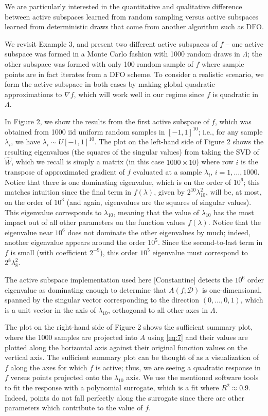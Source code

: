 \documentclass{amsart}
\begin{document}
We are particularly interested in the quantitative and qualitative difference between active subspaces learned from random sampling versus active subspaces learned from deterministic draws that come from another algorithm such as DFO.


We revisit Example 3, and present two different active subspaces of $f$ -- one active subspace was formed in a Monte Carlo fashion with 1000 random draws in $\Lambda$; the other subspace was formed with only 100 random sample of $f$ where sample points are in fact iterates from a DFO scheme. To consider a realistic scenario, we form the active subspace in both cases by making global quadratic approximations to $\nabla f$, which will work well in our regime since $f$ is quadratic in $\Lambda$.

In Figure 2, we show the results from the first active subspace of $f$, which was obtained from 1000 iid uniform random samples in $[-1,1]^{10}$; i.e., for any sample $\lambda_i$, we have $\lambda_i \sim U[-1,1]^{10}$. The plot on the left-hand side of Figure 2 shows the resulting eigenvalues (the squares of the singular values) from taking the SVD of $\hat{W}$, which we recall is simply a matrix (in this case $1000 \times 10$) where row $i$ is the transpose of approximated gradient of $f$ evaluated at a sample $\lambda_i$, $i=1,\ldots,1000$. Notice that there is one dominating eigenvalue, which is on the order of $10^6$; this matches intuition since the final term in $f(\lambda)$, given by $2^{10}\lambda_{10}^2$, will be, at most, on the order of $10^3$ (and again, eigenvalues are the squares of singular values). This eigenvalue corresponds to $\lambda_{10}$, meaning that the value of $\lambda_{10}$ has the most impact out of all other parameters on the function values $f(\lambda)$. Notice that the eigenvalue near $10^6$ does not dominate the other eigenvalues by much; indeed, another eigenvalue appears around the order $10^5$. Since the second-to-last term in $f$ is small (with coefficient $2^{-9}$), this order $10^5$ eigenvalue must correspond to $2^8\lambda_8^2$.

The active subspace implementation used here [Constantine] detects the $10^6$ order eigenvalue as dominating enough to determine that $A(f;\mathcal{D})$ is one-dimensional, spanned by the singular vector corresponding to the direction $(0,\ldots,0,1)$, which is a unit vector in the axis of $\lambda_{10}$, orthogonal to all other axes in $\Lambda$.

The plot on the right-hand side of Figure 2 shows the sufficient summary plot, where the 1000 samples are projected into $A$ using \eqref{eq:7} and their values are plotted along the horizontal axis against their original function values on the vertical axis. The sufficient summary plot can be thought of as a visualization of $f$ along the axes for which $f$ is active; thus, we are seeing a quadratic response in $f$ versus points projected onto the $\lambda_{10}$ axis. We use the mentioned software tools to fit the response with a polynomial surrogate, which is a fit where $R^2\approx 0.9$. Indeed, points do not fall perfectly along the surrogate since there are other parameters which contribute to the value of $f$.
\end{document}
